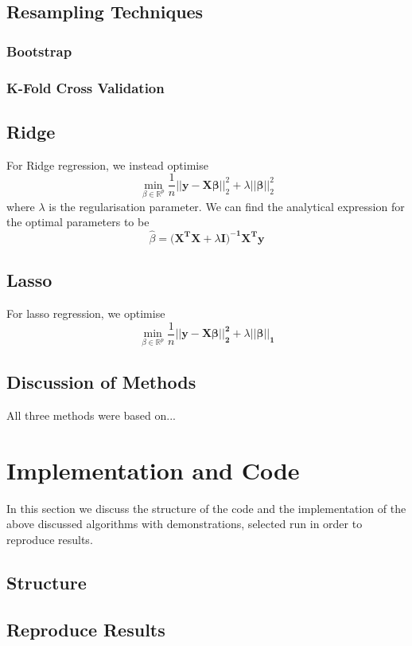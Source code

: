 \documentclass[sigconf, nonacm]{acmart}
\begin{document}
\subsection{Resampling Techniques}
\subsubsection{Bootstrap}%
\label{ssub:Bootstrap}

\subsubsection{K-Fold Cross Validation}%
\label{ssub:K-Fold Cross Validation}

\subsection{Ridge}
For Ridge regression, we instead optimise
\[ \min_{\beta \in \mathbb{R}^{p}} \frac{1}{n} \left | \left|\boldsymbol{y-X\beta} \right | \right |_2^{2} + \lambda \left ||\boldsymbol{\beta}\right||_2^2  \] 
where $ \lambda $ is the regularisation parameter.
We can find the analytical expression for the optimal parameters to be
\[ \hat \beta = \boldsymbol{(X^{T}X} + \lambda \boldsymbol{I)^{-1} X^{T} y}  \] 

\subsection{Lasso}
For lasso regression, we optimise
\[ \min_{\beta \in \mathbb{R}^{p}} \frac{1}{n} \boldsymbol{||y-X\beta||_2^2 + } \lambda||\boldsymbol{\beta||_1} \] 

\subsection{Discussion of Methods}
All three methods were based on... 
\section{Implementation and Code}
In this section we discuss the structure of the code and the implementation of the above discussed algorithms with demonstrations, selected run in order to reproduce results.
\subsection{Structure}

\subsection{Reproduce Results}
\end{document}

